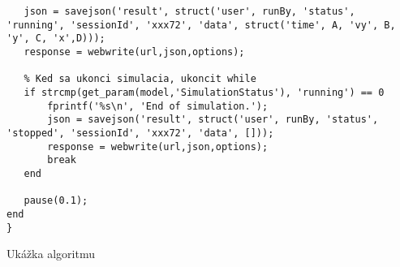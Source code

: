 \begin{algorithm}
\begin{lstlisting}
   json = savejson('result', struct('user', runBy, 'status', 'running', 'sessionId', 'xxx72', 'data', struct('time', A, 'vy', B, 'y', C, 'x',D)));
   response = webwrite(url,json,options);
   
   % Ked sa ukonci simulacia, ukoncit while
   if strcmp(get_param(model,'SimulationStatus'), 'running') == 0
       fprintf('%s\n', 'End of simulation.');
       json = savejson('result', struct('user', runBy, 'status', 'stopped', 'sessionId', 'xxx72', 'data', []));
       response = webwrite(url,json,options);
       break
   end

   pause(0.1);
end
}\end{lstlisting}
 \caption{Ukážka algoritmu}
 \label{matlab-simulation}
\end{algorithm}
